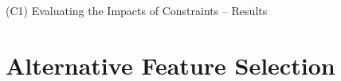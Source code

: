 \documentclass[en, navbarinline, handout]{sdqbeamer}
\begin{document}
\begin{frame}[t]{(C1) Evaluating the Impacts of Constraints -- Results}
\begin{figure}
\begin{subfigure}{0.48\textwidth}
		\end{subfigure}
	\end{figure}
\end{frame}

\section{Alternative Feature Selection}
\end{document}
